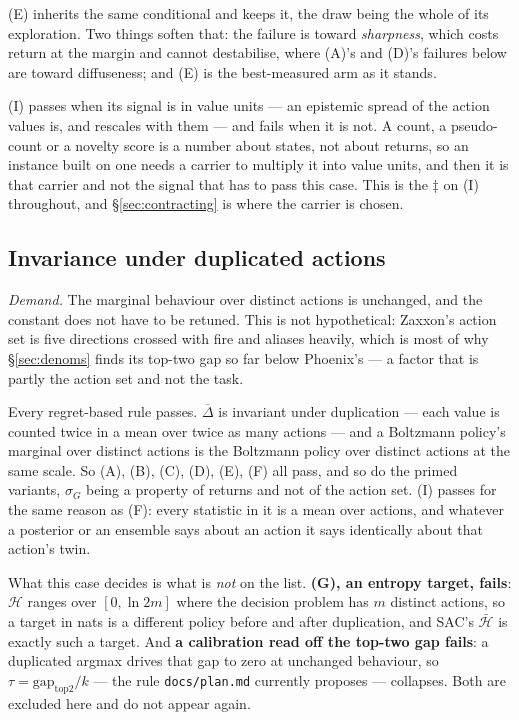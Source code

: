 \documentclass{article}
\newcommand{\h}{\mathcal{H}}
\newcommand{\gapbar}{\overline{\Delta}}
\newcommand{\snorm}{\sigma_{G}}
\begin{document}
(E) inherits the same conditional and keeps it, the draw being the whole of its exploration. Two
things soften that: the failure is toward \emph{sharpness}, which costs return at the margin and
cannot destabilise, where (A)'s and (D)'s failures below are toward diffuseness; and (E) is the
best-measured arm as it stands.

(I) passes when its signal is in value units --- an epistemic spread of the action values is, and
rescales with them --- and fails when it is not. A count, a pseudo-count or a novelty score is a
number about states, not about returns, so an instance built on one needs a carrier to multiply
it into value units, and then it is that carrier and not the signal that has to pass this case.
This is the $\ddagger$ on (I) throughout, and \S\ref{sec:contracting} is where the carrier is
chosen.

\subsection{Invariance under duplicated actions}
\label{sec:c3}

\emph{Demand.} The marginal behaviour over distinct actions is unchanged, and the constant does
not have to be retuned. This is not hypothetical: Zaxxon's action set is five directions crossed
with fire and aliases heavily, which is most of why \S\ref{sec:denoms} finds its top-two gap so
far below Phoenix's --- a factor that is partly the action set and not the task.

Every regret-based rule passes. $\gapbar$ is invariant under duplication --- each value is
counted twice in a mean over twice as many actions --- and a Boltzmann policy's marginal over
distinct actions is the Boltzmann policy over distinct actions at the same scale. So (A), (B),
(C), (D), (E), (F) all pass, and so do the primed variants, $\snorm$ being a property of
returns and not of the action set. (I) passes for the same reason as (F): every statistic in it
is a mean over actions, and whatever a posterior or an ensemble says about an action it says
identically about that action's twin.

What this case decides is what is \emph{not} on the list. \textbf{(G), an entropy target, fails}:
$\h$ ranges over $[0, \ln 2m]$ where the decision problem has $m$ distinct actions, so a target
in nats is a different policy before and after duplication, and SAC's $\bar{\h}$ is exactly such
a target. And \textbf{a calibration read off the top-two gap fails}: a duplicated argmax drives
that gap to zero at unchanged behaviour, so $\tau = \mathrm{gap}_{\mathrm{top2}}/k$ --- the rule
\texttt{docs/plan.md} currently proposes --- collapses. Both are excluded here and do not appear
again.
\end{document}
